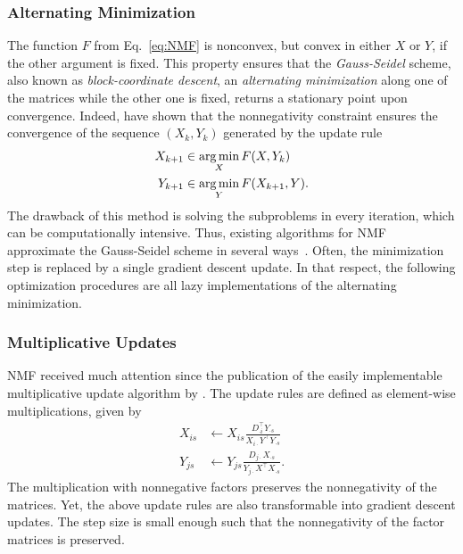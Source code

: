 \subsubsection{Alternating Minimization} \label{sec:ZS:AlternatingMinimization}
The function $F$ from Eq.~\eqref{eq:NMF} is nonconvex, but convex in either $X$ or $Y$, if the other argument is fixed. This property ensures that the \emph{Gauss-Seidel} scheme, also known as \emph{block-coordinate descent}, an \emph{alternating minimization} along one of the matrices while the other one is fixed, returns a stationary point upon convergence. Indeed, \cite{grippo2000convergence} have shown that the nonnegativity constraint ensures the convergence of the sequence $(X_k,Y_k)$ generated by the update rule
\begin{align}\label{eq:als}
\begin{split}
X_{k+1} &\in \operatorname*{arg\,min}_{X} F(X,Y_k)\\
Y_{k+1} &\in \operatorname*{arg\,min}_{Y} F(X_{k+1},Y).
\end{split}
\end{align}
The drawback of this method is solving the subproblems in every iteration, which can be computationally intensive. Thus, existing algorithms for NMF approximate the Gauss-Seidel scheme in several ways~\citep{wang2013nonnegative}. Often, the minimization step is replaced by a single gradient descent update. In that respect, the following optimization procedures are all lazy implementations of the alternating minimization.
%
\subsubsection{Multiplicative Updates}
NMF received much attention since the publication of the easily implementable multiplicative update algorithm by \cite{lee2001algorithms}. The update rules are defined as element-wise multiplications, given by
\begin{align}
X_{is} &\leftarrow X_{is} \frac{D_{\cdot i}^\top Y_{\cdot s}}{X_{i\cdot}Y^\top Y_{\cdot s}}\label{eq:multUpdateX}\\
Y_{js} &\leftarrow Y_{js}\frac{D_{j\cdot}X_{\cdot s}}{Y_{j\cdot}X^\top X_{\cdot s}}. \label{eq:multUpdateY} 
\end{align}
The multiplication with nonnegative factors preserves the nonnegativity of the matrices. Yet, the above update rules are also transformable into gradient descent updates. The step size is small enough such that the nonnegativity of the factor matrices is preserved.

